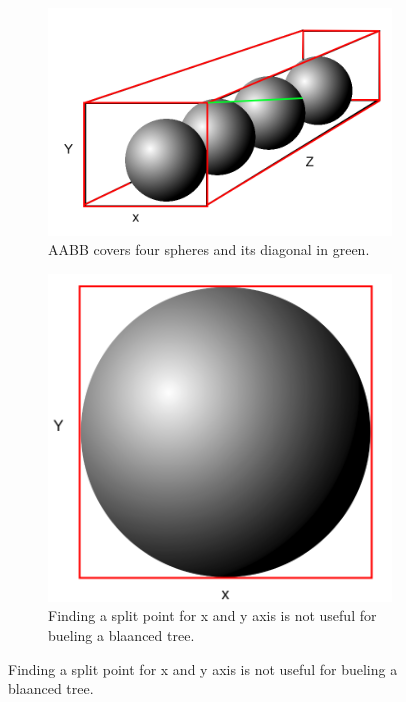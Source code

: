 \documentclass[11pt,a4paper]{article}
\begin{document}
\begin{figure}[H]	
     \centering
     \begin{subfigure}[b]{0.3\textwidth}
         \centering
         \includegraphics[width=\textwidth]{images/longaxis.png}
         \caption{AABB covers four spheres and its diagonal in green.}
         \label{fig:pi_4000}
     \end{subfigure}
     \hfill
     \begin{subfigure}[b]{0.3\textwidth}
         \centering
         \includegraphics[width=\textwidth]{images/LONGAXIS_Y.png}
         \caption{Finding a split point for x and y axis is not useful for bueling a blaanced tree.}

\end{subfigure}
\end{figure}
\end{document}
